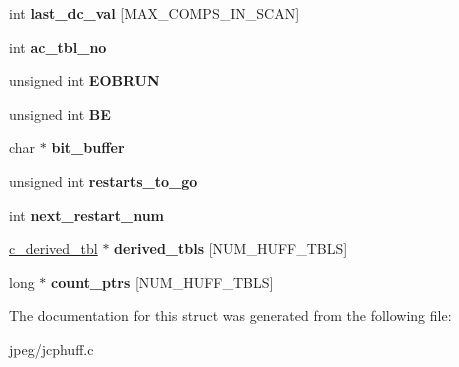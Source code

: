 \begin{DoxyCompactItemize}
\item 
int {\bfseries last\+\_\+dc\+\_\+val} \mbox{[}M\+A\+X\+\_\+\+C\+O\+M\+P\+S\+\_\+\+I\+N\+\_\+\+S\+C\+AN\mbox{]}\hypertarget{structphuff__entropy__encoder_af4311dbaf20faf519aafae3b5ac288e3}{}\label{structphuff__entropy__encoder_af4311dbaf20faf519aafae3b5ac288e3}

\item 
int {\bfseries ac\+\_\+tbl\+\_\+no}\hypertarget{structphuff__entropy__encoder_a5ad3b41f9cee34b445b3ffdf1cfd2d1c}{}\label{structphuff__entropy__encoder_a5ad3b41f9cee34b445b3ffdf1cfd2d1c}

\item 
unsigned int {\bfseries E\+O\+B\+R\+UN}\hypertarget{structphuff__entropy__encoder_ac83296a1d30bf22ea79a2ff417c2cda1}{}\label{structphuff__entropy__encoder_ac83296a1d30bf22ea79a2ff417c2cda1}

\item 
unsigned int {\bfseries BE}\hypertarget{structphuff__entropy__encoder_a8e30e7770f9116f43210500e357f44e8}{}\label{structphuff__entropy__encoder_a8e30e7770f9116f43210500e357f44e8}

\item 
char $\ast$ {\bfseries bit\+\_\+buffer}\hypertarget{structphuff__entropy__encoder_a4807a6a724ad2d51f238b39ae3279e66}{}\label{structphuff__entropy__encoder_a4807a6a724ad2d51f238b39ae3279e66}

\item 
unsigned int {\bfseries restarts\+\_\+to\+\_\+go}\hypertarget{structphuff__entropy__encoder_aa4bd50845141e3b84568fc4e4ea4d1a1}{}\label{structphuff__entropy__encoder_aa4bd50845141e3b84568fc4e4ea4d1a1}

\item 
int {\bfseries next\+\_\+restart\+\_\+num}\hypertarget{structphuff__entropy__encoder_add177307415d1c3ed8c7232c09442e92}{}\label{structphuff__entropy__encoder_add177307415d1c3ed8c7232c09442e92}

\item 
\hyperlink{structc__derived__tbl}{c\+\_\+derived\+\_\+tbl} $\ast$ {\bfseries derived\+\_\+tbls} \mbox{[}N\+U\+M\+\_\+\+H\+U\+F\+F\+\_\+\+T\+B\+LS\mbox{]}\hypertarget{structphuff__entropy__encoder_ac0cefd2b2e6f6c15ba6fc34c7c673ff7}{}\label{structphuff__entropy__encoder_ac0cefd2b2e6f6c15ba6fc34c7c673ff7}

\item 
long $\ast$ {\bfseries count\+\_\+ptrs} \mbox{[}N\+U\+M\+\_\+\+H\+U\+F\+F\+\_\+\+T\+B\+LS\mbox{]}\hypertarget{structphuff__entropy__encoder_a6052ee0472866d1a03a2acd83c5a2782}{}\label{structphuff__entropy__encoder_a6052ee0472866d1a03a2acd83c5a2782}

\end{DoxyCompactItemize}


The documentation for this struct was generated from the following file\+:\begin{DoxyCompactItemize}
\item 
jpeg/jcphuff.\+c\end{DoxyCompactItemize}
